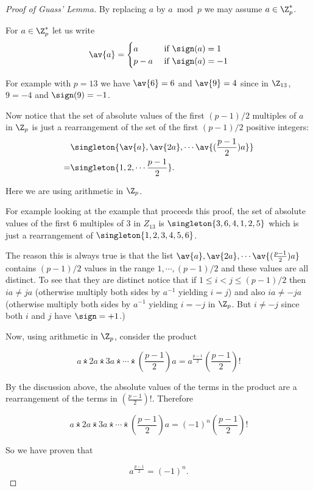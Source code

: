 \documentclass[oneside,12pt]{amsart}
\begin{document}
\begin{proof}[Proof of Guass' Lemma]
By replacing $a$ by $a\bmod p$ we may assume $a\in\Z^*_p$.

For $a\in\Z^*_p$ let us write 
$$\av{a}=
\begin{cases}
a &\text{ if } \sign(a) = 1 \\
p-a &\text{ if } \sign(a) = -1
\end{cases}
$$

For example with $p=13$ we have $\av{6} = 6$ and $\av{9}=4$ since in $\Z_{13}$, $9=-4$ and $\sign(9)=-1$.

Now notice that the set of absolute values of the first $(p-1)/2$ multiples of $a$ in $\Z_p$ is just a rearrangement
of the set of the first $(p-1)/2$ positive integers:
\begin{align*}
&\singleton{\av{a},\av{2a}, \cdots \av{(\frac{p-1}{2})a}} \\
= &\singleton{1,2,\cdots \frac{p-1}{2}}.
\end{align*}

Here we are using arithmetic in $\Z_p$.

For example looking at the example that proceeds this proof, the set of absolute values of the first 6 multiples
of 3 in $Z_{13}$ is $\singleton{3,6,4,1,2,5}$ which is just a rearrangement of $\singleton{1,2,3,4,5,6}$.

The reason this is always true is that the list $\av{a},\av{2a}, \cdots \av{(\frac{p-1}{2})a}$ contains $(p-1)/2$ values in the
range $1,\cdots, (p-1)/2$ and these values are all distinct. To see that they are distinct notice that
if $1\leq i<j\leq (p-1)/2$ then $ia\not= ja$ (otherwise multiply both sides by $a^{-1}$ yielding $i=j$) and also $ia\not=-ja$
(otherwise multiply both sides by $a^{-1}$ yielding $i=-j$ in $\Z_p$. But $i\not=-j$ since both $i$ and $j$ have $\sign=+1$.)

Now, using arithmetic in $\Z_p$, consider the product

$$ 
a \dottimes 2a \dottimes 3a \dottimes \cdots \dottimes \left(\frac{p-1}{2}\right)a = a^{\frac{p-1}{2}}\left(\frac{p-1}{2} \right)!
$$

By the discussion above, the absolute values of the terms in the product are a rearrangement of the terms in $\left(\frac{p-1}{2} \right)!$. Therefore

$$ 
a \dottimes 2a \dottimes 3a \dottimes \cdots \dottimes (\frac{p-1}{2})a = (-1)^n\left(\frac{p-1}{2} \right)!
$$

So we have proven that

$$
a^{\frac{p-1}{2}} = (-1)^n.
$$

\end{proof}
\end{document}
